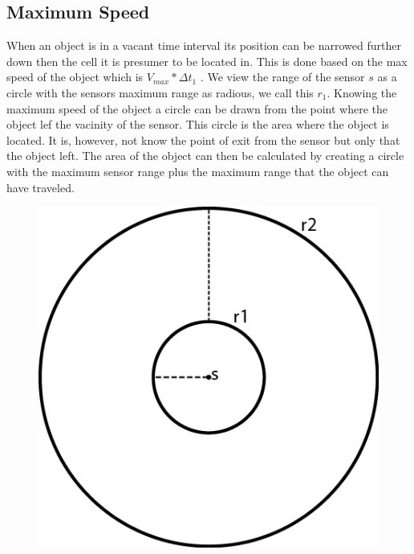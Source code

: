 \subsection{Maximum Speed}
When an object is in a vacant time interval its position can be narrowed further down then the cell it is presumer to be located in. 
This is done based on the max speed of the object which is $V_{max}*\Delta t_1$ . 
We view the range of the sensor $s$ as a circle with the sensors maximum range as radious, we call this $r_1$. 
Knowing the maximum speed of the object a circle can be drawn from the point where the object lef the vacinity of the sensor.
This circle is the area where the object is located. 
It is, however, not know the point of exit from the sensor but only that the object left. 
The area of the object can then be calculated by creating a circle with the maximum sensor range plus the maximum range that the object can have traveled. 





\begin{figure}%
\includegraphics{images/speed.png}%
\caption{}%
\label{}%
\end{figure}
